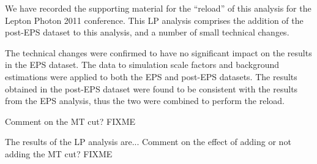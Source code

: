 
We have recorded the supporting material for the
``reload'' of this analysis for the Lepton Photon 2011 conference.
This LP analysis comprises the addition of the post-EPS dataset
to this analysis, and a number of small technical changes.

The technical changes were confirmed to have no significant 
impact on the results in the EPS dataset.  
The data to simulation scale factors and background estimations
were applied to both the EPS and post-EPS datasets.
The results obtained in the post-EPS dataset were found to be
consistent with the results from the EPS analysis, thus
the two were combined to perform the reload.

Comment on the MT cut?  FIXME

The results of the LP analysis are...
Comment on the effect of adding or not adding the MT cut? FIXME


